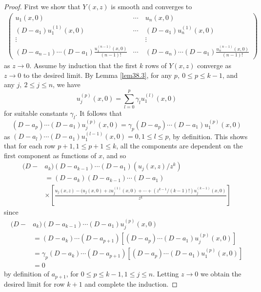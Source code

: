 \documentclass{surv-l}
\theoremstyle{plain}
\theoremstyle{definition}
\numberwithin{equation}{chapter}
\begin{document}
\begin{proof} First we show that $Y(x, z)$ is smooth and converges to
\begin{align*}
\left(\begin{array}{cccc}
u_{1}(x,0) & \cdots & u_{n}(x,0)\\
(D-a_{1})u_{1}^{(1)}(x,0) & \cdots & (D-a_{1})u_{n}^{(1)}(x,0)\\
\vdots & \quad & \vdots\\
(D-a_{n-1})\cdots(D-a_{1})\frac{u_{1}^{(n-1)}(x,0)}{(n-1)!} & \cdots & (D-a_{n})\cdots(D-a_{1})\frac{u_{n}^{(n-1)}(x,0)}{(n-1)!}
\end{array}\right)
\end{align*}
as $z\rightarrow 0$. Assume by induction that the first $k$ rows of $Y(x, z)$ converge as $z\rightarrow 0$ to the desired limit. By Lemma \ref{lem38.3}, for any $p,\ 0\leq p\leq k-1$, and any $j,\ 2\leq j\leq n$, we have
\begin{equation*}
u_{j}^{(p)}(x, 0)=\sum_{l=0}^{p}\gamma_{l}u_{1}^{(l)}(x, 0)
\end{equation*}
for suitable constants $\gamma_{l}$. It follows that
\begin{equation}\label{eq38.40}
(D-a_{p})\cdots(D-a_{1})u_{j}^{(p)}(x, 0)=\gamma_{p}(D-a_{p})\cdots(D-a_{1})u_{1}^{(p)}(x, 0)
\end{equation}
as $(D-a_{l})\cdots(D-a_{1})u_{1}^{(l-1)}(x, 0)=0,1\leq l\leq p$, by definition. This shows that for each row $p+1,1\leq p+1\leq k$, all the components are dependent on the first component as functions of $x$, and so
\begin{align*}
(D-&a_{k})(D-a_{k-1})\cdots(D-a_{1})(u_{j}(x, z)/z^{k})\\
&=(D-a_{k})(D-a_{k-1})\cdots(D-a_{1})\\
&\times\left[\frac{u_{j}(x,z)-(u_{j}(x,0)+zu_{j}^{(1)}(x,0)+\cdots+(z^{k-1}/(k-1)!)u_{j}^{(k-1)}(x,0)}{z^{k}}\right]
\end{align*}
since
\begin{align*}
(D-&a_{k})(D-a_{k-1})\cdots(D-a_{1})u_{j}^{(p)}(x, 0)\\
&=(D-a_{k})\cdots(D-a_{p+1})[(D-a_{p})\cdots(D-a_{1})u_{j}^{(p)}(x, 0)]\\
&=\gamma_{p}(D-a_{k})\cdots(D-a_{p+1})[(D-a_{p})\cdots(D-a_{1})u_{1}^{(p)}(x, 0)]\\
&=0
\end{align*}
by definition of $a_{p+1}$, for $0\leq p\leq k-1,1\leq j\leq n$. Letting $z\rightarrow 0$ we obtain the desired limit for row $k+1$ and complete the induction.


\end{proof}
\end{document}
